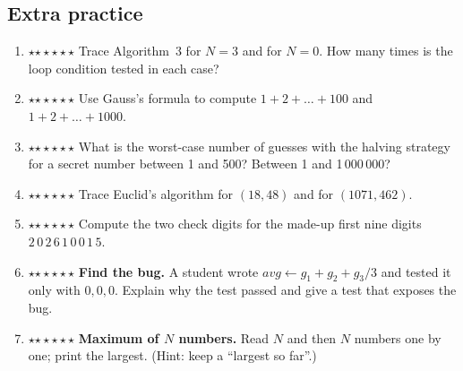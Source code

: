 \documentclass[11pt,a4paper]{article}
\newif\ifsolutions
\newcommand{\READ}{\textbf{READ}\ }
\newcommand{\START}{\State \textbf{START}}
\newcommand{\MOD}{\mathbin{\mathrm{mod}}}
\newcommand{\solution}[1]{\ifsolutions\begin{solbox}#1\end{solbox}\fi}
\newcommand{\stars}[1]{\textcolor{amberdk}{\ifcase#1\or$\star$\or$\star\star$\or$\star\star\star$\fi}}
\begin{document}
\subsection{Extra practice}
\begin{enumerate}[label=\textbf{P\arabic*.},leftmargin=*,itemsep=3pt]
  \item \stars{1} Trace Algorithm~3 for $N=3$ and for $N=0$. How many times is the loop condition tested in each case?
  \solution{$N=3$: output $6$; the condition is tested $4$ times ($i=1,2,3$ true; $i=4$ false). $N=0$: output $0$; tested once. In general the condition is tested $N+1$ times for $N\ge0$.}
  \item \stars{1} Use Gauss's formula to compute $1+2+\dots+100$ and $1+2+\dots+1000$.
  \solution{$100\cdot101/2 = 5050$; $1000\cdot1001/2 = 500\,500$.}
  \item \stars{2} What is the worst-case number of guesses with the halving strategy for a secret number between 1 and 500? Between 1 and 1\,000\,000?
  \solution{$\lceil\log_2 501\rceil = 9$ (since $2^9=512\ge501$); $\lceil\log_2 1\,000\,001\rceil = 20$ (since $2^{20}=1\,048\,576$).}
  \item \stars{2} Trace Euclid's algorithm for $(18,48)$ and for $(1071,462)$.
  \solution{$(18,48)$: rows $(18,48,18)$, $(48,18,12)$, $(18,12,6)$, $(12,6,0)$; result $6$. $(1071,462)$: rows $(1071,462,147)$, $(462,147,21)$, $(147,21,0)$; result $21$.}
  \item \stars{2} Compute the two check digits for the made-up first nine digits $2\,0\,2\,6\,1\,0\,0\,1\,5$.
  \solution{Odd positions: $2+2+1+0+5=10$; even positions: $0+6+0+1=7$. $d_{10} = (70-7)\MOD 10 = 63 \MOD 10 = 3$. $d_{11} = (17+3)\MOD 10 = 0$. Full number: $20261001530$.}
  \item \stars{2} \textbf{Find the bug.} A student wrote \quad $avg \gets g_1 + g_2 + g_3 / 3$ \quad and tested it only with $0,0,0$. Explain why the test passed and give a test that exposes the bug.
  \solution{For $0,0,0$ both formulas give $0$, so this test cannot tell them apart. Any non-zero input exposes it, e.g.\ $60,70,80$: correct $70$, buggy $156.67$. Lesson: a single ``trivial'' test is not enough.}
  \item \stars{2} \textbf{Maximum of $N$ numbers.} Read $N$ and then $N$ numbers one by one; print the largest. (Hint: keep a ``largest so far''.)
  \solution{
  \begin{algorithmic}[1]
  \START \State \READ $N$ \State \READ $x$ \State $max \gets x$ \State $i \gets 2$
  \WhileX{$i \le N$} \State \READ $x$ \IfX{$x > max$} \State $max \gets x$ \EndIfX \State $i \gets i+1$ \EndWhileX

\end{algorithmic}}
\end{enumerate}
\end{document}
